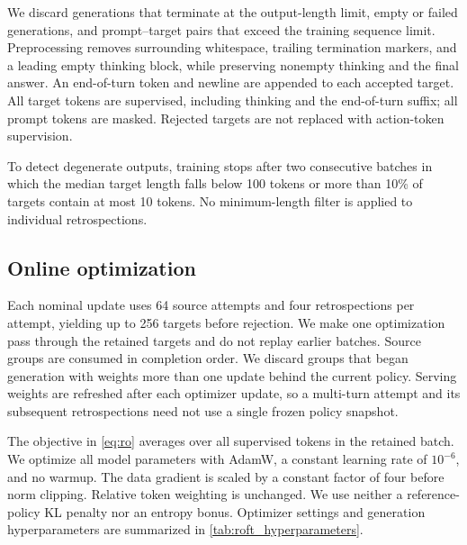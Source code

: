 We discard generations that terminate at the output-length limit,
empty or failed generations, and prompt--target pairs that exceed the
training sequence limit. Preprocessing removes surrounding whitespace,
trailing termination markers, and a leading empty thinking block, while
preserving nonempty thinking and the final answer. An end-of-turn token
and newline are appended to each accepted target. All target tokens are
supervised, including thinking and the end-of-turn suffix; all prompt
tokens are masked. Rejected targets are not replaced with action-token
supervision.

To detect degenerate outputs, training stops after two consecutive batches
in which the median target length falls below 100 tokens or more than
10\% of targets contain at most 10 tokens. No minimum-length filter
is applied to individual retrospections.

\subsection{Online optimization}
\label{app:roft_loss_implementation}

Each nominal update uses 64 source attempts and four retrospections
per attempt, yielding up to
256 targets before rejection. We make one optimization pass through
the retained targets and do not replay earlier batches. Source groups
are consumed in completion order. We discard groups that began generation
with weights more than one update behind the current policy.
Serving weights are refreshed after each optimizer update, so a
multi-turn attempt and its subsequent retrospections need not use a
single frozen policy snapshot.

The objective in \cref{eq:ro} averages over all supervised
tokens in the retained batch.
We optimize all model parameters with AdamW, a constant learning rate
of $10^{-6}$, and no warmup. The data gradient is scaled by a constant
factor of four before norm clipping.
Relative token weighting is unchanged.
We use neither a reference-policy KL penalty nor an entropy bonus.
Optimizer settings and generation hyperparameters are summarized in
\cref{tab:roft_hyperparameters}.

